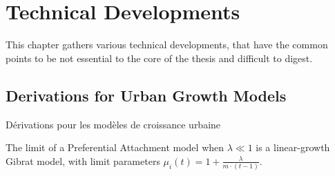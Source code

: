 \chapter{Technical Developments} %

\label{app:technical} %






This chapter gathers various technical developments, that have the common points to be not essential to the core of the thesis and difficult to digest.


\section{Derivations for Urban Growth Models}{Dérivations pour les modèles de croissance urbaine}





\begin{lemma}
The limit of a Preferential Attachment model when $\lambda \ll 1$ is a linear-growth Gibrat model, with limit parameters $\mu_i(t)=1+\frac{\lambda}{m\cdot (t-1)}$.
\end{lemma}

